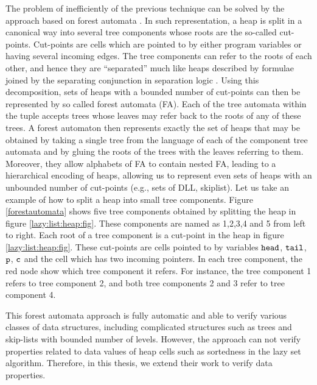 The problem of inefficiently of the previous technique can be solved by the approach based on forest automata \cite{foresterfull}. In such representation, a heap is split in a canonical way into several tree components whose roots are the so-called cut-points. Cut-points are cells which are pointed to by either program variables or having several incoming edges. The tree components can refer to the roots of each other, and hence they are “separated” much like heaps described by formulae joined by the separating conjunction in separation logic \cite{John:SL}. Using this decomposition, sets of heaps with a bounded number of cut-points can then be represented by so called forest automata (FA). Each of the tree
automata within the tuple accepts trees whose leaves may refer back to the
roots of any of these trees. A forest automaton then represents exactly the set
of heaps that may be obtained by taking a single tree from the language of each
of the component tree automata and by gluing the roots of the trees with the
leaves referring to them. %
 Moreover, they allow alphabets of FA to contain nested FA, leading to a hierarchical encoding of heaps, allowing us to represent even sets of heaps with an unbounded number of cut-points (e.g., sets of DLL, skiplist). 
Let us take an example of how to split a heap into small tree components. Figure \ref{forestautomata} shows five tree components obtained by splitting the heap in figure \ref{lazy:list:heap:fig}. These components are named as 1,2,3,4 and 5 from left to right. Each root of a tree component is a cut-point in the heap in figure \ref{lazy:list:heap:fig}. These cut-points are cells pointed to by variables $\tt head$, $\tt tail$,  $\tt p$,  $\tt c$ and the cell which has two incoming pointers. In each tree component, the red node show which  tree component it refers. For instance, the tree component 1 refers to tree component 2, and both tree components 2 and 3 refer to tree component 4.

This forest automata approach is fully automatic and able to verify various classes of data structures, including complicated structures such as trees and skip-lists with bounded number of levels. 
However, the approach can not verify properties related to data values of heap cells such as sortedness in the lazy set algorithm. Therefore, in this thesis, we extend their work to verify data properties. 

